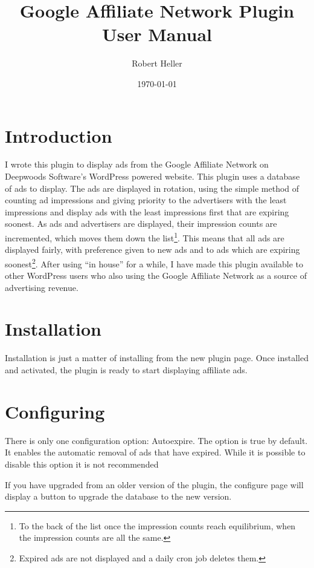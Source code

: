 \documentclass[letterpaper]{article}
\title{Google Affiliate Network Plugin User Manual}
\author{Robert Heller}
\date{\today}
\begin{document}
\maketitle

\tableofcontents

\section{Introduction}

I wrote this plugin to display ads from the Google Affiliate Network on
Deepwoods Software's WordPress powered website. This plugin uses a
database of ads to display.  The ads are displayed in rotation, using
the simple method of counting ad impressions and giving priority to the
advertisers with the least impressions and display ads with the least
impressions first that are expiring soonest.  As ads and advertisers
are displayed, their impression counts are incremented, which moves
them down the list\footnote{To the back of the list once the impression
counts reach equilibrium, when the impression counts are all the
same.}.  This means that all ads are displayed fairly, with preference
given to new ads and to ads which are expiring soonest\footnote{Expired
ads are not displayed and a daily cron job deletes them.}. After using
``in house'' for a while, I have made this plugin available to other
WordPress users who also using the Google Affiliate Network as a source
of advertising revenue.

\section{Installation}

Installation is just a matter of installing from the new plugin
page.  Once installed and activated, the plugin is ready to start
displaying affiliate ads.

\section{Configuring}

There is only one configuration option: Autoexpire. The option is
true by default.  It enables the automatic removal of ads that have
expired. While it is possible to disable this option it is not
recommended

If you have upgraded from an older version of the plugin, the
configure page will display a button to upgrade the database to the new
version.
\end{document}
